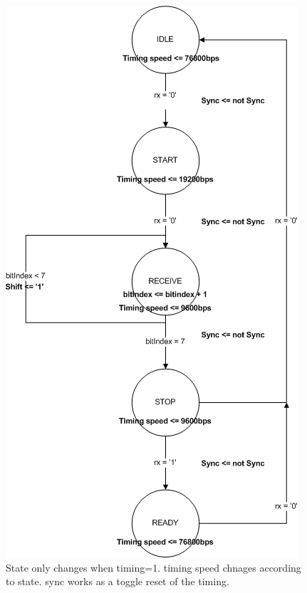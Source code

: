 \documentclass[a4paper]{scrartcl}
\begin{document}
		\begin{figure}[H]
			\centering
			\includegraphics[scale=0.7]{rxmachine.png}
			\caption{State only changes when timing=1. timing speed chnages according to state.  sync works as a toggle reset of the timing.}
		\end{figure}
\end{document}
